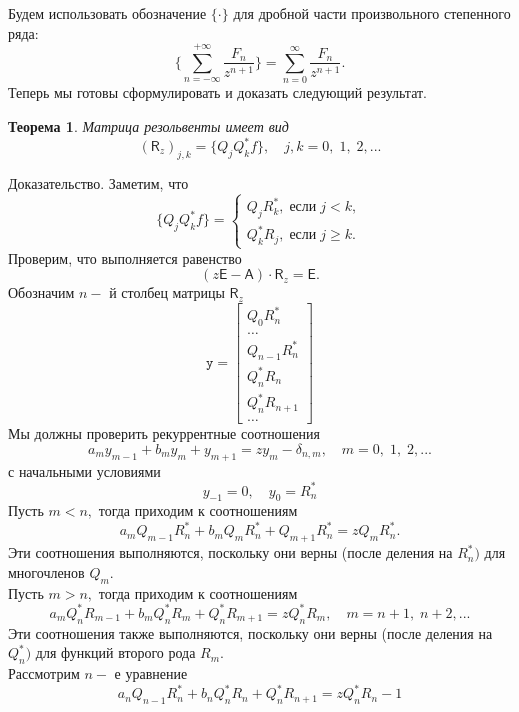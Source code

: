 \documentclass[12pt,a4paper]{article}
\theoremstyle{plain}   \newtheorem{Pro}{Задача}
\newtheorem{The}{Теорема}
\begin{document}
Будем использовать обозначение
$ \{ \cdot \} $
для дробной части произвольного степенного ряда:
$$
  \biggl \{ \sum _{n=-\infty}^{+\infty}
  \frac{ F_n }{z^{n+1}} \biggr \} =
  \sum _{n=0}^{\infty} \frac{F_n }{z^{n+1}}.
$$
Теперь мы готовы сформулировать и доказать следующий
результат.
\begin{The}
Матрица резольвенты имеет вид
$$
  (\mathsf{R}_z )_{j,k}=
  \{ Q_j Q_k ^{\ast} f \} ,
  \quad j,k=0, \; 1, \; 2,...
$$
\end{The}
{\Large Доказательство.}
Заметим, что
\begin{equation*}
  \{ Q_j Q_k ^{\ast} f \} =
    \begin{cases}
	  Q_j R_k ^{\ast}, \; если \; j<k,\\
	  Q_k ^{\ast} R_j , \; если \; j \geq k.
	\end{cases}
\end{equation*}
Проверим, что выполняется равенство
$$
  (z \mathsf{E} - \mathsf{A} ) \cdot \mathsf{R}_z = \mathsf{E}.
$$
Обозначим
$ n- $
й столбец матрицы
$ \mathsf{R}_z $
\begin{equation*}
  \mathtt{y}=
    \begin{bmatrix}
	  Q_0 R_n ^{\ast}\\
	  \dots \\
	  Q_{n-1} R_n ^{\ast} \\
	  Q_n ^{\ast} R_n \\
	  Q_n ^{\ast} R_{n+1} \\
	  \dots
	\end{bmatrix}
\end{equation*}
Мы должны проверить рекуррентные соотношения
$$
  a_m y_{m-1} + b_m y_m +y_{m+1} =
  z y_m - \delta _{n,m},
  \quad m=0, \; 1, \; 2,...
$$
с начальными условиями
$$
  y_{-1}=0, \quad y_0 = R_n ^{\ast}
$$
Пусть
$ m<n, $
тогда приходим к соотношениям
$$
  a_m Q_{m-1} R_n ^{\ast} +
  b_m Q_m R_n ^{\ast} +
  Q_{m+1} R_n ^{\ast} =
  z Q_m R_n ^{\ast}.
$$
Эти соотношения выполняются, поскольку они верны (после деления на
$ R_n ^{\ast}) $
для многочленов
$ Q_m . $
\\
Пусть
$ m>n, $
тогда приходим к соотношениям
$$
  a_m Q_n ^{\ast} R_{m-1}+
  b_m Q_n ^{\ast} R_m +
  Q_n ^{\ast} R_{m+1}=
  z Q_n ^{\ast} R_m ,
  \quad m=n+1, \; n+2,...
$$
Эти соотношения также выполняются, поскольку они верны
(после деления на
$ Q_n ^{\ast} )$
для функций второго рода
$ R_m . $
\\
Рассмотрим
$ n-$
е уравнение
$$
  a_n Q_{n-1} R_n ^{\ast} +
  b_n Q_n ^{\ast} R_n +
  Q_n ^{\ast} R_{n+1} =
  z Q_n ^{\ast} R_n -1
$$
\end{document}
